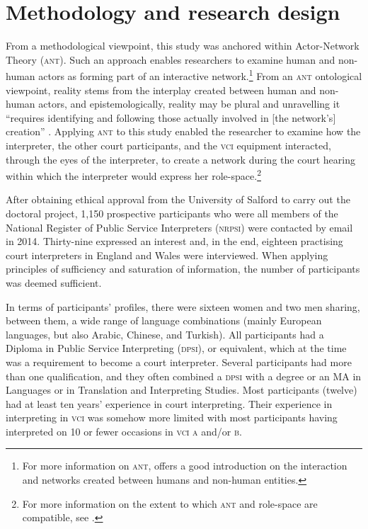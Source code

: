 \documentclass[output=paper]{langsci/langscibook}
\begin{document}
\section{Methodology and research design}
\label{sec:devaux:4}
From a methodological viewpoint, this study was anchored within Actor-Net\-work Theory (\textsc{ant}). Such an approach enables researchers to examine human and non-human actors as forming part of an interactive network.\footnote{For more information on \textsc{ant}, \citet{Latour2005} offers a good introduction on the interaction and networks created between humans and non-human entities.} From an \textsc{ant} ontological viewpoint, reality stems from the interplay created between human and non-human actors, and epistemologically, reality may be plural and unravelling it “requires identifying and following those actually involved in [the network’s] creation” \citep[112]{Bonner2013}. Applying \textsc{ant} to this study enabled the researcher to examine how the interpreter, the other court participants, and the \textsc{vci} equipment interacted, through the eyes of the interpreter, to create a network during the court hearing within which the interpreter would express her role-space.\footnote{For more information on the extent to which \textsc{ant} and role-space are compatible, see \citet{Devaux2017b}.} 

After obtaining ethical approval from the University of Salford to carry out the doctoral project, 1,150 prospective participants who were all members of the National Register of Public Service Interpreters (\textsc{nrpsi}) were contacted by email in 2014. Thirty-nine expressed an interest and, in the end, eighteen practising court interpreters in England and Wales were interviewed. When applying  principles of sufficiency and saturation of information, the number of participants was deemed sufficient. 

In terms of participants’ profiles, there were sixteen women and two men sharing, between them, a wide range of language combinations (mainly European languages, but also Arabic, Chinese, and Turkish). All participants had a Diploma in Public Service Interpreting (\textsc{dpsi}), or equivalent, which at the time was a requirement to become a court interpreter. Several participants had more than one qualification, and they often combined a \textsc{dpsi} with a degree or an MA in Languages or in Translation and Interpreting Studies. Most participants (twelve) had at least ten years’ experience in court interpreting. Their experience in interpreting in \textsc{vci} was somehow more limited with most participants having interpreted on 10 or fewer occasions in \textsc{vci a} and/or \textsc{b}.   
\end{document}
